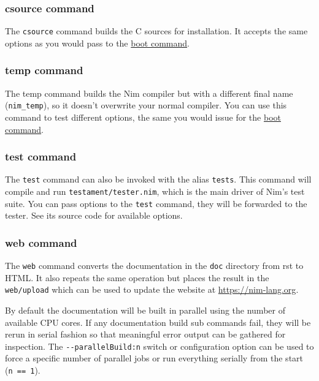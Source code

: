 \hypertarget{csource-command}{%
\subsubsection{csource command}\label{csource-command}}

The \texttt{csource} command builds the C sources for installation. It
accepts the same options as you would pass to the
\protect\hyperlink{commands-boot-command}{boot command}.

\hypertarget{temp-command}{%
\subsubsection{temp command}\label{temp-command}}

The temp command builds the Nim compiler but with a different final name
(\texttt{nim\_temp}), so it doesn't overwrite your normal compiler. You
can use this command to test different options, the same you would issue
for the \protect\hyperlink{commands-boot-command}{boot command}.

\hypertarget{test-command}{%
\subsubsection{test command}\label{test-command}}

The \texttt{test} command can also be invoked with the alias
\texttt{tests}. This command will compile and run
\texttt{testament/tester.nim}, which is the main driver of Nim's test
suite. You can pass options to the \texttt{test} command, they will be
forwarded to the tester. See its source code for available options.

\hypertarget{web-command}{%
\subsubsection{web command}\label{web-command}}

The \texttt{web} command converts the documentation in the \texttt{doc}
directory from rst to HTML. It also repeats the same operation but
places the result in the \texttt{web/upload} which can be used to update
the website at \url{https://nim-lang.org}.

By default the documentation will be built in parallel using the number
of available CPU cores. If any documentation build sub commands fail,
they will be rerun in serial fashion so that meaningful error output can
be gathered for inspection. The \texttt{-\/-parallelBuild:n} switch or
configuration option can be used to force a specific number of parallel
jobs or run everything serially from the start (\texttt{n\ ==\ 1}).
